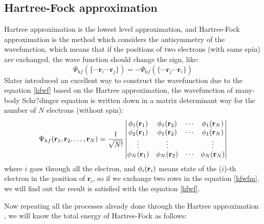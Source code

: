 \documentclass[a4paper, 12pt, titlepage,oneside,drop]{kthesis}
\begin{document}

\subsection{Hartree-Fock approximation}
\noindent Hartree approximation is the lowest level approximation, and Hartree-Fock approximation is the method which considers the 
antisymmetry of the wavefunction, which means that if the positions of two electrons (with same spin) are exchanged, the wave 
function should change the sign, like:
\begin{equation}\label{hfwf}
\Psi_\textit{hf} (\{ \cdots \textbf{r}_\textit{i} \cdots  \textbf{r}_\textit{j} \}) = - \Psi_\textit{hf} (\{ \cdots \textbf{r}_\textit{j} \cdots  \textbf{r}_\textit{i} \})
\end{equation}
\noindent Slater introduced  an excellent way to construct the wavefunction due to the equation \ref{hfwf} based on the Hartree approximation, 
the wavefunction of many- body Schr?dinger equation is written down  in a matrix determinant way for the number of $N$ electrons 
(without spin):
\begin{equation}\label{hfwfm}
\Psi_{hf}(\mathbf{r}_1, \mathbf{r}_2, \ldots, \mathbf{r}_N) =
\frac{1}{\sqrt{N!}} \left|
\begin{matrix}
    \bwf<1><1> & \bwf<1><2> & \cdots & \bwf<1><N> \\
    \bwf<2><1> & \bwf<1><2> & \cdots & \bwf<1><N> \\
    \vdots               & \vdots               &        & \vdots               \\
    \bwf<N><1> & \bwf<N><2> & \cdots & \bwf<N><N>
\end{matrix} \right|
\end{equation}
\noindent where $i$ goes through all the electron, and $\bwf<i><i>$ means state of the ($i$)-th electron in the position of $\textbf{r}_\textit{i}$, so if we exchange two rows
 in the equation \ref{hfwfm}, we will find out the result is satisfied with the equation \ref{hfwf}.

\noindent Now repeating all the processes already done through the Hartree approximation , we will know the total energy of Hartree-Fock as follows:
\end{document}
